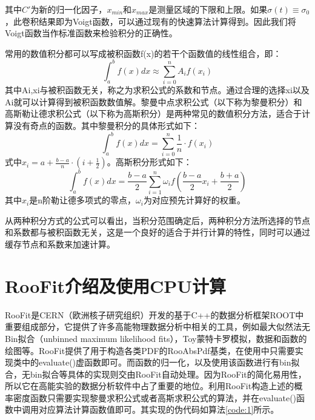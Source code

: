 其中$C'$为新的归一化因子，$x_{min}$和$x_{max}$是测量区域的下限和上限。如果$\sigma(t)\equiv\sigma_0$，此卷积结果即为Voigt函数，可以通过现有的快速算法计算得到\supercite{abrarov2011efficient}。因此我们将Voigt函数当作标准函数来检验积分的正确性。

常用的数值积分都可以写成被积函数f(x)的若干个函数值的线性组合，即：
\begin{equation}
    \int_a^bf(x)dx\approx\sum_{i=0}^n A_i f(x_i)
\end{equation}
其中Ai,xi与被积函数无关，称之为求积公式的系数和节点\supercite{jisuanfangfa}。通过合理的选择xi以及Ai就可以计算得到被积函数数值解。黎曼中点求积公式（以下称为黎曼积分）和高斯勒让德求积公式（以下称为高斯积分）是两种常见的数值积分方法\supercite{jisuanfangfa}，适合于计算没有奇点的函数。其中黎曼积分的具体形式如下：
\begin{equation}
    \int_a^bf(x)dx = \sum_{i=0}^n \frac{1}{n}\cdot f(x_i)
\end{equation}
式中$x_i=a+\frac{b-a}{n}\cdot(i+\frac{1}{2})$。高斯积分形式如下：
\begin{equation}
\int_a^bf(x)dx=\frac{b-a}{2}\sum_{i=1}^n\omega_if(\frac{b-a}{2}x_i+\frac{b+a}{2})
\end{equation}
其中$x_i$是n阶勒让德多项式的零点，$\omega_i$为对应预先计算好的权重\supercite{jisuanfangfa}\supercite{bogaert2014iteration}。

从两种积分方式的公式可以看出，当积分范围确定后，两种积分方法所选择的节点和系数都与被积函数无关，这是一个良好的适合于并行计算的特性，同时可以通过缓存节点和系数来加速计算。

\section{RooFit介绍及使用CPU计算}

RooFit是CERN（欧洲核子研究组织）开发的基于C++的数据分析框架ROOT中重要组成部分\supercite{roofit}\supercite{root}，它提供了许多高能物理数据分析中相关的工具，例如最大似然法无Bin拟合（unbinned maximum likelihood fits），Toy蒙特卡罗模拟，数据和函数的绘图等。RooFit提供了用于构造各类PDF的RooAbsPdf基类，在使用中只需要实现类中的evaluate()虚函数即可。而函数的归一化，以及使用该函数进行有bin拟合，无bin拟合等具体的实现则交由RooFit自动处理。因为RooFit的简化易用性，所以它在高能实验的数据分析软件中占了重要的地位。利用RooFit构造上述的概率密度函数只需要实现黎曼求积公式或者高斯求积公式的算法，并在evaluate()函数中调用对应算法计算函数值即可。其实现的伪代码如算法\ref{code:1}所示。

